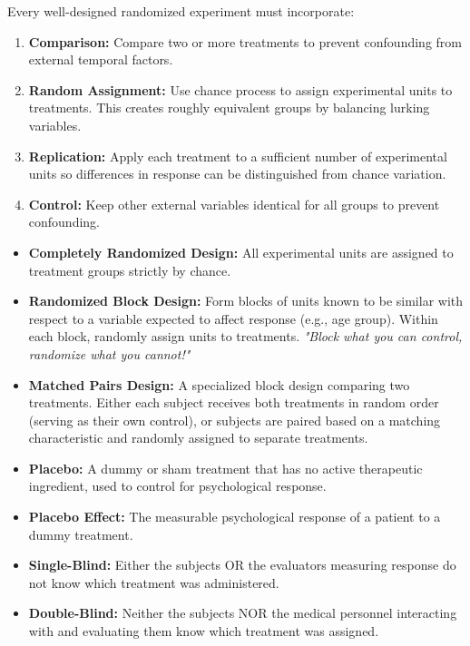\begin{lessonbox}
Every well-designed randomized experiment must incorporate:
\begin{enumerate}[leftmargin=1.5em]
  \item \textbf{Comparison:} Compare two or more treatments to prevent confounding from external temporal factors.
  \item \textbf{Random Assignment:} Use chance process to assign experimental units to treatments. This creates roughly equivalent groups by balancing lurking variables.
  \item \textbf{Replication:} Apply each treatment to a sufficient number of experimental units so differences in response can be distinguished from chance variation.
  \item \textbf{Control:} Keep other external variables identical for all groups to prevent confounding.
\end{enumerate}
\end{lessonbox}

\begin{lessonbox}
\begin{itemize}[leftmargin=1.2em]
  \item \textbf{Completely Randomized Design:} All experimental units are assigned to treatment groups strictly by chance.
  \item \textbf{Randomized Block Design:} Form blocks of units known to be similar with respect to a variable expected to affect response (e.g., age group). Within each block, randomly assign units to treatments. \textit{"Block what you can control, randomize what you cannot!"}
  \item \textbf{Matched Pairs Design:} A specialized block design comparing two treatments. Either each subject receives both treatments in random order (serving as their own control), or subjects are paired based on a matching characteristic and randomly assigned to separate treatments.
\end{itemize}
\end{lessonbox}

\begin{lessonbox}
\begin{itemize}[leftmargin=1.2em]
  \item \textbf{Placebo:} A dummy or sham treatment that has no active therapeutic ingredient, used to control for psychological response.
  \item \textbf{Placebo Effect:} The measurable psychological response of a patient to a dummy treatment.
  \item \textbf{Single-Blind:} Either the subjects OR the evaluators measuring response do not know which treatment was administered.
  \item \textbf{Double-Blind:} Neither the subjects NOR the medical personnel interacting with and evaluating them know which treatment was assigned.
\end{itemize}
\end{lessonbox}

